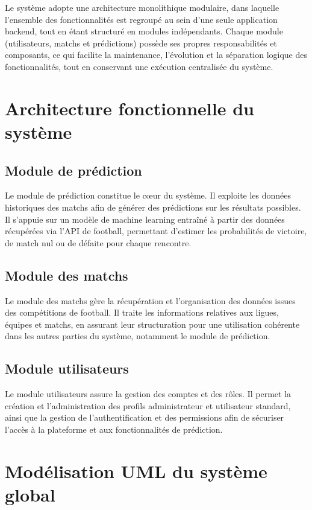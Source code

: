 Le système adopte une architecture monolithique modulaire, dans laquelle l’ensemble des fonctionnalités est regroupé au sein d’une seule application backend, tout en étant structuré en modules indépendants. Chaque module (utilisateurs, matchs et prédictions) possède ses propres responsabilités et composants, ce qui facilite la maintenance, l’évolution et la séparation logique des fonctionnalités, tout en conservant une exécution centralisée du système.
\section{Architecture fonctionnelle du système}

\subsection{Module de prédiction}

Le module de prédiction constitue le cœur du système. Il exploite les données historiques des matchs afin de générer des prédictions sur les résultats possibles. Il s’appuie sur un modèle de machine learning entraîné à partir des données récupérées via l’API de football, permettant d’estimer les probabilités de victoire, de match nul ou de défaite pour chaque rencontre.

\subsection{Module des matchs}

Le module des matchs gère la récupération et l’organisation des données issues des compétitions de football. Il traite les informations relatives aux ligues, équipes et matchs, en assurant leur structuration pour une utilisation cohérente dans les autres parties du système, notamment le module de prédiction.

\subsection{Module utilisateurs}

Le module utilisateurs assure la gestion des comptes et des rôles. Il permet la création et l’administration des profils administrateur et utilisateur standard, ainsi que la gestion de l’authentification et des permissions afin de sécuriser l’accès à la plateforme et aux fonctionnalités de prédiction.

\section{Modélisation UML du système global}

